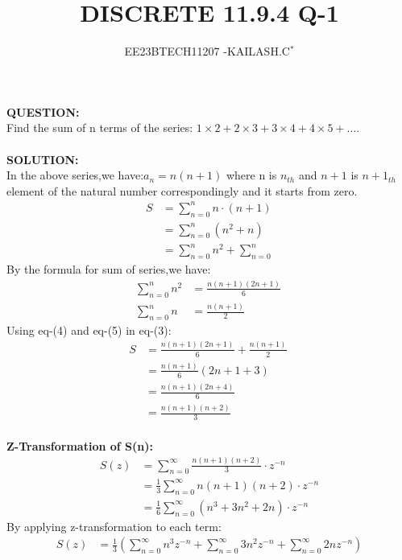 \documentclass[journal,12pt,twocolumn]{IEEEtran}
\theoremstyle{remark}
\begin{document}

\vspace{3cm}

\title{DISCRETE 11.9.4 Q-1}
\author{EE23BTECH11207 -KAILASH.C$^{*}$%
}
\maketitle
\newpage
\bigskip

\renewcommand{\thefigure}{\theenumi}
\renewcommand{\thetable}{\theenumi}


\textbf{QUESTION:}\\
Find the sum of n terms of the series:
$1\times2+2\times3+3\times4+4\times5+....$\\ \\
\textbf{SOLUTION:}\\
In the above series,we have:$a_n=n(n+1)$ where n is $n_{th}$ and $n+1$ is ${n+1}_{th}$element of the natural number correspondingly and it starts from zero.
\begin{align}
     S&=\sum_{n=0}^{n} n \cdot (n+1)\\
     &=\sum_{n=0}^{n} (n^2 + n)\\
     &=\sum_{n=0}^{n} n^2 + \sum_{n=0}^{n}
\end{align}
By the formula for sum of series,we have:
\begin{align}
    \sum_{n=0}^{n} n^2&=\frac{n(n+1)(2n+1)}{6}\ \\
    \sum_{n=0}^{n} n&=\frac{n(n+1)}{2}\
\end{align}
Using eq-(4) and eq-(5) in eq-(3):
\begin{align}
    S&=\frac{n(n+1)(2n+1)}{6} + \frac{n(n+1)}{2}\ \\
    &=\frac{n(n+1)}{6} (2n+1 + 3)\ \\
    &=\frac{n(n+1)(2n+4)}{6}\\
    &=\frac{n(n+1)(n+2)}{3}
\end{align}\\
\textbf{Z-Transformation of S(n):}\\
\begin{align}
S(z)&=\sum_{n=0}^{\infty} \frac{n(n+1)(n+2)}{3} \cdot z^{-n}\\
&=\frac{1}{3} \sum_{n=0}^{\infty} n(n+1)(n+2) \cdot z^{-n}\\
&=\frac{1}{6} \sum_{n=0}^{\infty} (n^3 + 3n^2 + 2n) \cdot z^{-n}
\end{align}
By applying z-transformation to each term:
\begin{align}
    S(z)&=\frac{1}{3}\left(\sum_{n=0}^{\infty}n^3 z^{-n}+\sum_{n=0}^{\infty}3n^2z^{-n}+\sum_{n=0}^{\infty}2nz^{-n}\right)
\end{align}
\end{document}
